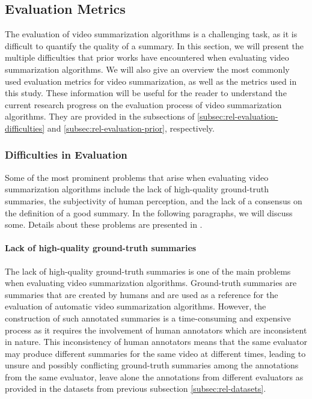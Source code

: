 \subsection{Evaluation Metrics}
\label{subsec:rel-evaluation}

	The evaluation of video summarization algorithms is a challenging task, as it is difficult to quantify the quality of a summary. In this section, we will present the multiple difficulties that prior works have encountered when evaluating video summarization algorithms. We will also give an overview the most commonly used evaluation metrics for video summarization, as well as the metrics used in this study. These information will be useful for the reader to understand the current research progress on the evaluation process of video summarization algorithms. They are provided in the subsections of \ref{subsec:rel-evaluation-difficulties} and \ref{subsec:rel-evaluation-prior}, respectively.
	
	\subsubsection{Difficulties in Evaluation}
	\label{subsubsec:rel-evaluation-difficulties}
		Some of the most prominent problems that arise when evaluating video summarization algorithms include the lack of high-quality ground-truth summaries, the subjectivity of human perception, and the lack of a consensus on the definition of a good summary. In the following paragraphs, we will discuss some. Details about these problems are presented in \cite{Apostolidis2021Video}.

			\paragraph[short]{Lack of high-quality ground-truth summaries}
				The lack of high-quality ground-truth summaries is one of the main problems when evaluating video summarization algorithms. Ground-truth summaries are summaries that are created by humans and are used as a reference for the evaluation of automatic video summarization algorithms. However, the construction of such annotated summaries is a time-consuming and expensive process as it requires the involvement of human annotators which are inconsistent in nature. This inconsistency of human annotators means that the same evaluator may produce different summaries for the same video at different times, leading to unsure and possibly conflicting ground-truth summaries among the annotations from the same evaluator, leave alone the annotations from different evaluators as provided in the datasets from previous subsection \ref{subsec:rel-datasets}.

